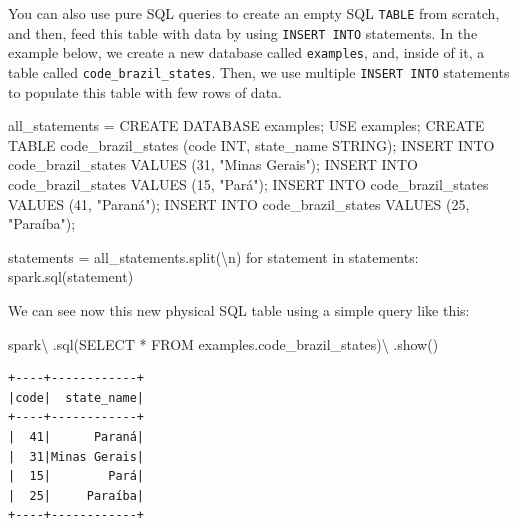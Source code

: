\documentclass[
  11pt,
  letterpaper,
  DIV=11,
  numbers=noendperiod]{scrreprt}
\newenvironment{Shaded}{\begin{snugshade}}{\end{snugshade}}
\newcommand{\CharTok}[1]{\textcolor[rgb]{0.13,0.47,0.30}{#1}}
\newcommand{\ControlFlowTok}[1]{\textcolor[rgb]{0.00,0.23,0.31}{#1}}
\newcommand{\KeywordTok}[1]{\textcolor[rgb]{0.00,0.23,0.31}{#1}}
\newcommand{\NormalTok}[1]{\textcolor[rgb]{0.00,0.23,0.31}{#1}}
\newcommand{\OperatorTok}[1]{\textcolor[rgb]{0.37,0.37,0.37}{#1}}
\newcommand{\StringTok}[1]{\textcolor[rgb]{0.13,0.47,0.30}{#1}}
\begin{document}
You can also use pure SQL queries to create an empty SQL \texttt{TABLE}
from scratch, and then, feed this table with data by using
\texttt{INSERT\ INTO} statements. In the example below, we create a new
database called \texttt{examples}, and, inside of it, a table called
\texttt{code\_brazil\_states}. Then, we use multiple
\texttt{INSERT\ INTO} statements to populate this table with few rows of
data.

\begin{Shaded}
\begin{Highlighting}[]
\NormalTok{all\_statements }\OperatorTok{=} \StringTok{\textquotesingle{}\textquotesingle{}\textquotesingle{}CREATE DATABASE \textasciigrave{}examples\textasciigrave{};}
\StringTok{USE \textasciigrave{}examples\textasciigrave{};}
\StringTok{CREATE TABLE \textasciigrave{}code\_brazil\_states\textasciigrave{} (\textasciigrave{}code\textasciigrave{} INT, \textasciigrave{}state\_name\textasciigrave{} STRING);}
\StringTok{INSERT INTO \textasciigrave{}code\_brazil\_states\textasciigrave{} VALUES (31, "Minas Gerais");}
\StringTok{INSERT INTO \textasciigrave{}code\_brazil\_states\textasciigrave{} VALUES (15, "Pará");}
\StringTok{INSERT INTO \textasciigrave{}code\_brazil\_states\textasciigrave{} VALUES (41, "Paraná");}
\StringTok{INSERT INTO \textasciigrave{}code\_brazil\_states\textasciigrave{} VALUES (25, "Paraíba");\textquotesingle{}\textquotesingle{}\textquotesingle{}}

\NormalTok{statements }\OperatorTok{=}\NormalTok{ all\_statements.split(}\StringTok{\textquotesingle{}}\CharTok{\textbackslash{}n}\StringTok{\textquotesingle{}}\NormalTok{)}
\ControlFlowTok{for}\NormalTok{ statement }\KeywordTok{in}\NormalTok{ statements:}
\NormalTok{  spark.sql(statement)}
\end{Highlighting}
\end{Shaded}

We can see now this new physical SQL table using a simple query like
this:

\begin{Shaded}
\begin{Highlighting}[]
\NormalTok{spark}\OperatorTok{\textbackslash{}}
\NormalTok{  .sql(}\StringTok{\textquotesingle{}SELECT * FROM examples.code\_brazil\_states\textquotesingle{}}\NormalTok{)}\OperatorTok{\textbackslash{}}
\NormalTok{  .show()}
\end{Highlighting}
\end{Shaded}

\begin{verbatim}
+----+------------+
|code|  state_name|
+----+------------+
|  41|      Paraná|
|  31|Minas Gerais|
|  15|        Pará|
|  25|     Paraíba|
+----+------------+
\end{verbatim}
\end{document}
